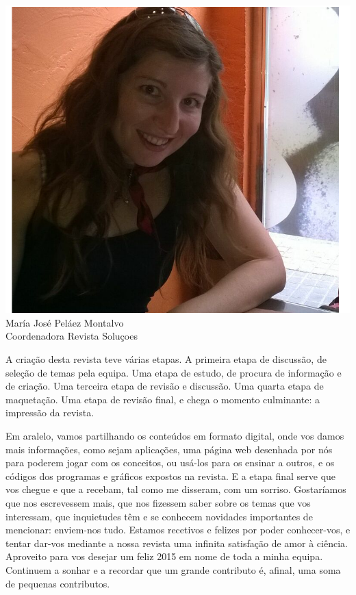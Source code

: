 \begin{multicols}{2}
  \begin{figurebox}
       \centering
  \includegraphics[scale=0.29]{maria.png}\\
    María José Peláez Montalvo\\ 
    {\small Coordenadora Revista Soluçoes}\\
    \vspace{1pt}
  \end{figurebox}
\vspace{1cm}

A criação desta revista teve várias etapas. A primeira etapa de
discussão, de seleção de temas pela equipa. Uma etapa de estudo, de
procura de informação e de criação. Uma terceira etapa de revisão e
discussão. Uma quarta etapa de maquetação. Uma etapa de revisão final,
e chega o momento culminante: a impressão da revista.

Em aralelo, vamos partilhando os conteúdos em formato digital, onde
vos damos mais informações, como sejam aplicações, uma página web
desenhada por nós para poderem jogar com os conceitos, ou usá-los para
os ensinar a outros, e os códigos dos programas e gráficos expostos na
revista. E a etapa final serve que vos chegue e que a recebam, tal
como me disseram, com um sorriso.  Gostaríamos que nos escrevessem
mais, que nos fizessem saber sobre os temas que vos interessam, que
inquietudes têm e se conhecem novidades importantes de mencionar:
enviem-nos tudo. Estamos recetivos e felizes por poder conhecer-vos, e
tentar dar-vos mediante a nossa revista uma infinita satisfação de
amor à ciência.  Aproveito para vos desejar um feliz 2015 em nome de
toda a minha equipa. Continuem a sonhar e a recordar que um grande
contributo é, afinal, uma soma de pequenas contributos.


\end{multicols}
